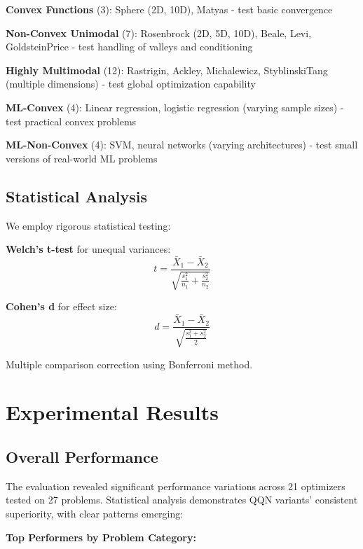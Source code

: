 \textbf{Convex Functions} (3): Sphere (2D, 10D), Matyas - test basic convergence

\textbf{Non-Convex Unimodal} (7): Rosenbrock (2D, 5D, 10D), Beale, Levi, GoldsteinPrice - test handling of valleys and conditioning

\textbf{Highly Multimodal} (12): Rastrigin, Ackley, Michalewicz, StyblinskiTang (multiple dimensions) - test global optimization capability

\textbf{ML-Convex} (4): Linear regression, logistic regression (varying sample sizes) - test practical convex problems

\textbf{ML-Non-Convex} (4): SVM, neural networks (varying architectures) - test small versions of real-world ML problems

\hypertarget{statistical-analysis}{%
\subsection{Statistical Analysis}\label{statistical-analysis}}

We employ rigorous statistical testing:

\textbf{Welch's t-test} for unequal variances:
\[t = \frac{\bar{X}_1 - \bar{X}_2}{\sqrt{\frac{s_1^2}{n_1} + \frac{s_2^2}{n_2}}}\]

\textbf{Cohen's d} for effect size:
\[d = \frac{\bar{X}_1 - \bar{X}_2}{\sqrt{\frac{s_1^2 + s_2^2}{2}}}\]

Multiple comparison correction using Bonferroni method.

\hypertarget{experimental-results}{%
\section{Experimental Results}\label{experimental-results}}

\hypertarget{overall-performance}{%
\subsection{Overall Performance}\label{overall-performance}}

The evaluation revealed significant performance variations across 21 optimizers tested on 27 problems. Statistical analysis demonstrates QQN variants' consistent superiority, with clear patterns emerging:

\textbf{Top Performers by Problem Category:}

